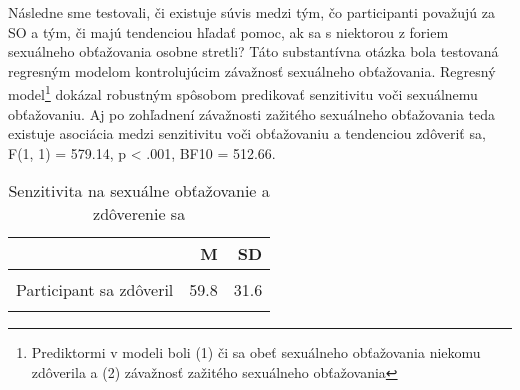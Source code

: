 \documentclass[
]{article}
\begin{document}
\begin{table}[H]

\caption{\label{tab:sensFieldReg}Senzitivita na sexuálne obťažovanie - regresný model}
\centering
{}
\end{table}

Následne sme testovali, či existuje súvis medzi tým, čo participanti považujú za SO a tým, či majú tendenciou hľadať pomoc, ak sa s niektorou z foriem sexuálneho obťažovania osobne stretli? Táto substantívna otázka bola testovaná regresným modelom kontrolujúcim závažnosť sexuálneho obťažovania. Regresný model\footnote{Prediktormi v modeli boli (1) či sa obeť sexuálneho obťažovania niekomu zdôverila a (2) závažnosť zažitého sexuálneho obťažovania} dokázal robustným spôsobom predikovať senzitivitu voči sexuálnemu obťažovaniu. Aj po zohľadnení závažnosti zažitého sexuálneho obťažovania teda existuje asociácia medzi senzitivitu voči obťažovaniu a tendenciou zdôveriť sa, F(1, 1) = 579.14, p \textless{} .001, BF10 = 512.66.

\begin{table}[H]

\caption{\label{tab:unnamed-chunk-6}Senzitivita na sexuálne obťažovanie a zdôverenie sa}
\centering
\fontsize{10}{12}\selectfont
\begin{tabular}[t]{lrr}
\toprule
  & M & SD\\
\midrule
\cellcolor{gray!6}{Participant sa nezdôveril} & \cellcolor{gray!6}{49.9} & \cellcolor{gray!6}{34.4}\\
Participant sa zdôveril & 59.8 & 31.6\\
\cellcolor{gray!6}{Participant nebol obeťou obťažovania} & \cellcolor{gray!6}{56.2} & \cellcolor{gray!6}{33.8}\\
\bottomrule
\end{tabular}
\end{table}
\end{document}
